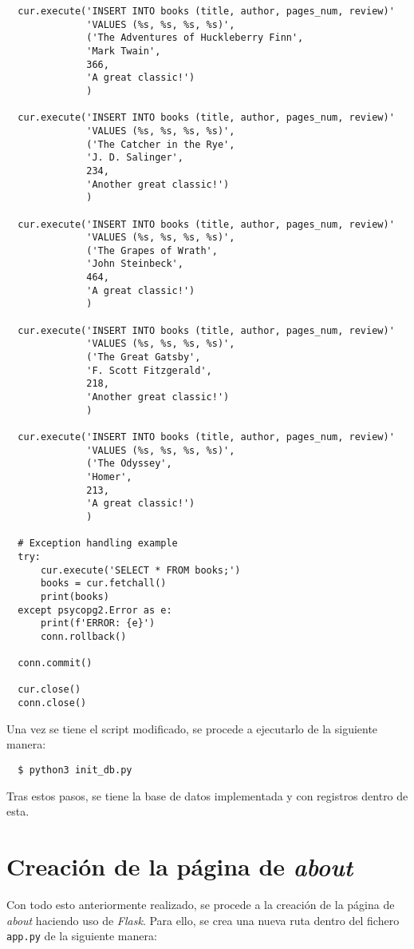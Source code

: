 \documentclass[11pt]{report}
\begin{document}
\begin{verbatim}
  cur.execute('INSERT INTO books (title, author, pages_num, review)'
              'VALUES (%s, %s, %s, %s)',
              ('The Adventures of Huckleberry Finn',
              'Mark Twain',
              366,
              'A great classic!')
              )

  cur.execute('INSERT INTO books (title, author, pages_num, review)'
              'VALUES (%s, %s, %s, %s)',
              ('The Catcher in the Rye',
              'J. D. Salinger',
              234,
              'Another great classic!')
              )

  cur.execute('INSERT INTO books (title, author, pages_num, review)'
              'VALUES (%s, %s, %s, %s)',
              ('The Grapes of Wrath',
              'John Steinbeck',
              464,
              'A great classic!')
              )

  cur.execute('INSERT INTO books (title, author, pages_num, review)'
              'VALUES (%s, %s, %s, %s)',
              ('The Great Gatsby',
              'F. Scott Fitzgerald',
              218,
              'Another great classic!')
              )

  cur.execute('INSERT INTO books (title, author, pages_num, review)'
              'VALUES (%s, %s, %s, %s)',
              ('The Odyssey',
              'Homer',
              213,
              'A great classic!')
              )

  # Exception handling example
  try:
      cur.execute('SELECT * FROM books;')
      books = cur.fetchall()
      print(books)
  except psycopg2.Error as e:
      print(f'ERROR: {e}')
      conn.rollback()

  conn.commit()

  cur.close()
  conn.close()
\end{verbatim}

Una vez se tiene el script modificado, se procede a ejecutarlo de la siguiente manera:

\begin{verbatim}
  $ python3 init_db.py
\end{verbatim}

Tras estos pasos, se tiene la base de datos implementada y con registros dentro de esta.

\section{Creación de la página de \emph{about}}

Con todo esto anteriormente realizado, se procede a la creación de la página de \emph{about} haciendo uso de \emph{Flask}. Para ello, se crea una nueva ruta dentro del fichero \texttt{app.py} de la siguiente manera:
\end{document}
